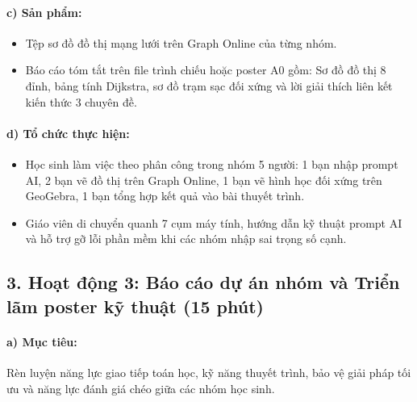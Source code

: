 \documentclass[12pt, a4paper]{article}
\begin{document}
\paragraph{c) Sản phẩm:}
\begin{itemize}[leftmargin=0.8cm]
    \item Tệp sơ đồ đồ thị mạng lưới trên Graph Online của từng nhóm.
    \item Báo cáo tóm tắt trên file trình chiếu hoặc poster A0 gồm: Sơ đồ đồ thị 8 đỉnh, bảng tính Dijkstra, sơ đồ trạm sạc đối xứng và lời giải thích liên kết kiến thức 3 chuyên đề.
\end{itemize}

\paragraph{d) Tổ chức thực hiện:}
\begin{itemize}[leftmargin=0.8cm]
    \item Học sinh làm việc theo phân công trong nhóm 5 người: 1 bạn nhập prompt AI, 2 bạn vẽ đồ thị trên Graph Online, 1 bạn vẽ hình học đối xứng trên GeoGebra, 1 bạn tổng hợp kết quả vào bài thuyết trình.
    \item Giáo viên di chuyển quanh 7 cụm máy tính, hướng dẫn kỹ thuật prompt AI và hỗ trợ gỡ lỗi phần mềm khi các nhóm nhập sai trọng số cạnh.
\end{itemize}

\subsection*{3. Hoạt động 3: Báo cáo dự án nhóm và Triển lãm poster kỹ thuật (15 phút)}

\paragraph{a) Mục tiêu:} Rèn luyện năng lực giao tiếp toán học, kỹ năng thuyết trình, bảo vệ giải pháp tối ưu và năng lực đánh giá chéo giữa các nhóm học sinh.
\end{document}
